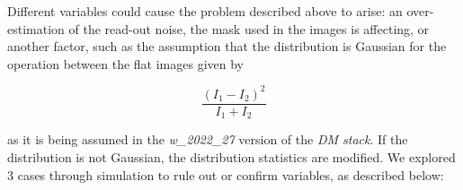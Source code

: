 \vspace{3mm}

Different variables could cause the problem described above to arise: an over-estimation of the read-out noise, the mask used in the images is affecting, or another factor, such as the assumption that the distribution is Gaussian for the operation between the flat images given by  

\begin{equation}
      \frac{(I_1 - I_2)^2}{I_1 + I_2} 
      \label{eq:ratioIm}
\end{equation}

as it is being assumed in the \textit{w\_2022\_27} version of the \textit{DM stack}. If the distribution is not Gaussian, the distribution statistics are modified. We explored 3 cases through simulation to rule out or confirm variables, as described below:

